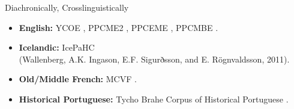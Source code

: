 \documentclass[hyperref={pdfpagelabels=false}]{beamer}
\begin{document}












\begin{frame}{Diachronically, Crosslinguistically}
\begin{itemize}
	\item \textbf{English:} YCOE \citep{ycoe}, PPCME2 \citep{ppcme2}, PPCEME \citep{ppceme}, PPCMBE \citep{ppcmbe}.
	\item \textbf{Icelandic:} IcePaHC \\(Wallenberg, A.K. Ingason, E.F. Sigurðsson, and E. Rögnvaldsson, 2011)\nocite{icepahc09}.
	\item \textbf{Old/Middle French:} MCVF \citep{mcvf}.
	\item \textbf{Historical Portuguese:} Tycho Brahe Corpus of Historical Portuguese \citep{tychobrahe}.
	\end{itemize}

\end{frame}





\end{document}
